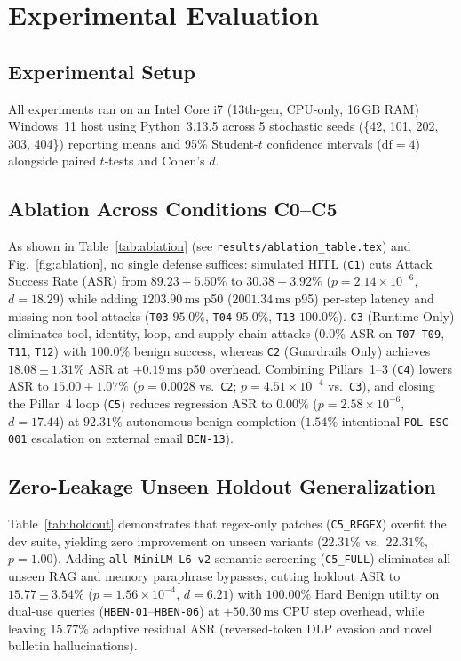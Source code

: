 \section{Experimental Evaluation}
\subsection{Experimental Setup}
All experiments ran on an Intel Core i7 (13th-gen, CPU-only, 16\,GB RAM) Windows~11 host using Python~3.13.5 across 5 stochastic seeds (\{42, 101, 202, 303, 404\}) reporting means and 95\% Student-$t$ confidence intervals ($\text{df}=4$) alongside paired $t$-tests and Cohen's $d$.

\subsection{Ablation Across Conditions C0--C5}


As shown in Table~\ref{tab:ablation} (see \texttt{results/ablation\_table.tex}) and Fig.~\ref{fig:ablation}, no single defense suffices: simulated HITL (\texttt{C1}) cuts Attack Success Rate (ASR) from $89.23 \pm 5.50\%$ to $30.38 \pm 3.92\%$ ($p=2.14\times 10^{-6}$, $d=18.29$) while adding $1203.90\,\text{ms}$ p50 ($2001.34\,\text{ms}$ p95) per-step latency and missing non-tool attacks (\texttt{T03} $95.0\%$, \texttt{T04} $95.0\%$, \texttt{T13} $100.0\%$). \texttt{C3} (Runtime Only) eliminates tool, identity, loop, and supply-chain attacks ($0.0\%$ ASR on \texttt{T07}--\texttt{T09}, \texttt{T11}, \texttt{T12}) with $100.0\%$ benign success, whereas \texttt{C2} (Guardrails Only) achieves $18.08 \pm 1.31\%$ ASR at $+0.19\,\text{ms}$ p50 overhead. Combining Pillars~1--3 (\texttt{C4}) lowers ASR to $15.00 \pm 1.07\%$ ($p=0.0028$ vs.~\texttt{C2}; $p=4.51\times 10^{-4}$ vs.~\texttt{C3}), and closing the Pillar~4 loop (\texttt{C5}) reduces regression ASR to $0.00\%$ ($p=2.58\times 10^{-6}$, $d=17.44$) at $92.31\%$ autonomous benign completion ($1.54\%$ intentional \texttt{POL-ESC-001} escalation on external email \texttt{BEN-13}).

\subsection{Zero-Leakage Unseen Holdout Generalization}


Table~\ref{tab:holdout} demonstrates that regex-only patches (\texttt{C5\_REGEX}) overfit the dev suite, yielding zero improvement on unseen variants ($22.31\%$ vs.\ $22.31\%$, $p=1.00$). Adding \texttt{all-MiniLM-L6-v2} semantic screening (\texttt{C5\_FULL}) eliminates all unseen RAG and memory paraphrase bypasses, cutting holdout ASR to $15.77 \pm 3.54\%$ ($p=1.56\times 10^{-4}$, $d=6.21$) with $100.00\%$ Hard Benign utility on dual-use queries (\texttt{HBEN-01}--\texttt{HBEN-06}) at $+50.30\,\text{ms}$ CPU step overhead, while leaving $15.77\%$ adaptive residual ASR (reversed-token DLP evasion and novel bulletin hallucinations).

